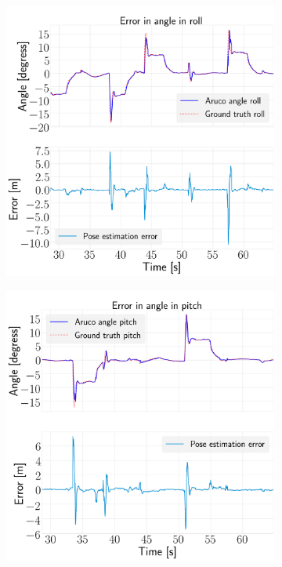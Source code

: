 \documentclass[../Head/report.tex]{subfiles}
\begin{document}
\begin{figure}[H]
    \centering
    \begin{subfigure}[t]{.30\textwidth}
        \centering
        \includegraphics[width=\textwidth]{../Figures/vision_navigation/test1_full_pattern_board/error_roll/pose_error_roll_test1.png}
        \caption{}
        \label{fig:vision_navigation_error_roll}
    \end{subfigure}
     \hspace{0.2em}
    \begin{subfigure}[t]{.30\textwidth}
        \centering
        \includegraphics[width=\textwidth]{../Figures/vision_navigation/test1_full_pattern_board/error_pitch/pose_error_pitch_test1.png}

\end{subfigure}
\end{figure}
\end{document}
